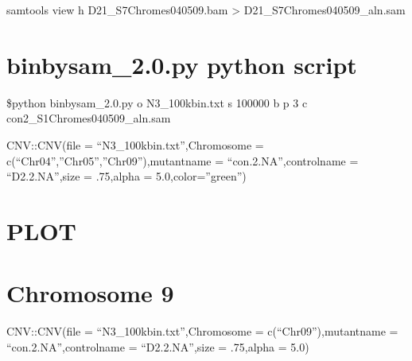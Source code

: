 \documentclass[letterpaper,10pt,english]{sphinxhowto}
\begin{document}
\sphinxAtStartPar
samtools view \sphinxhyphen{}h D2\sphinxhyphen{}1\_S7\sphinxhyphen{}Chromes\sphinxhyphen{}04\sphinxhyphen{}05\sphinxhyphen{}09.bam \textgreater{} D2\sphinxhyphen{}1\_S7\sphinxhyphen{}Chromes\sphinxhyphen{}04\sphinxhyphen{}05\sphinxhyphen{}09\_aln.sam


\section{bin\sphinxhyphen{}by\sphinxhyphen{}sam\_2.0.py python script}
\label{\detokenize{CNV:bin-by-sam-2-0-py-python-script}}
\sphinxAtStartPar
\$python bin\sphinxhyphen{}by\sphinxhyphen{}sam\_2.0.py \sphinxhyphen{}o N3\_100kbin.txt \sphinxhyphen{}s 100000 \sphinxhyphen{}b \sphinxhyphen{}p 3 \sphinxhyphen{}c con\sphinxhyphen{}2\_S1\sphinxhyphen{}Chromes\sphinxhyphen{}04\sphinxhyphen{}05\sphinxhyphen{}09\_aln.sam

\sphinxAtStartPar
{}

\sphinxAtStartPar
CNV::CNV(file = “N3\_100kbin.txt”,Chromosome = c(“Chr04”,”Chr05”,”Chr09”),mutantname = “con.2.NA”,controlname = “D2.2.NA”,size = .75,alpha = 5.0,color=”green”)


\section{PLOT}
\label{\detokenize{CNV:plot}}
\begin{figure}[htbp]
\centering

\noindent{}
\end{figure}


\section{Chromosome 9}
\label{\detokenize{CNV:chromosome-9}}
\sphinxAtStartPar
CNV::CNV(file = “N3\_100kbin.txt”,Chromosome = c(“Chr09”),mutantname = “con.2.NA”,controlname = “D2.2.NA”,size = .75,alpha = 5.0)

\begin{figure}[htbp]
\centering

\noindent{}
\end{figure}



\renewcommand{\indexname}{Index}
\printindex
\end{document}
